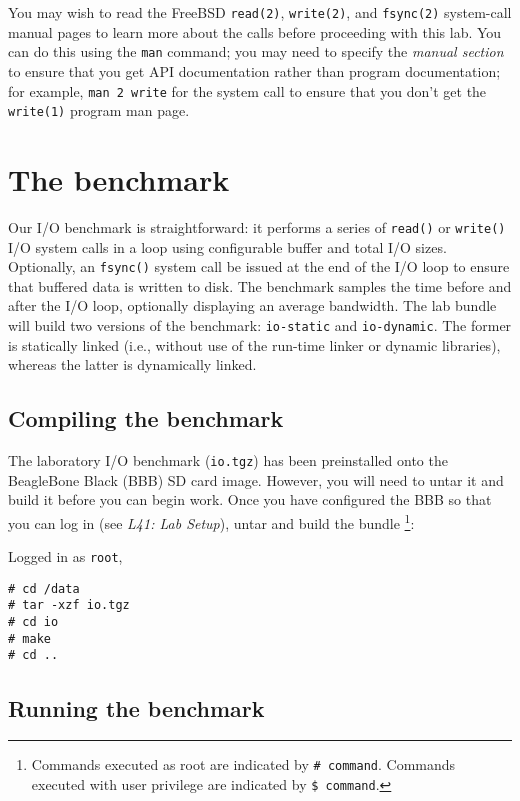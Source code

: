 \documentclass[a4paper,10pt]{article}
\begin{document}
You may wish to read the FreeBSD \texttt{read(2)}, \texttt{write(2)}, and
\texttt{fsync(2)} system-call manual pages to learn more about the calls
before proceeding with this lab.
You can do this using the \texttt{man} command; you may need to specify the
\textit{manual section} to ensure that you get API documentation rather than
program documentation; for example, \texttt{man 2 write} for the system call
to ensure that you don't get the \texttt{write(1)} program man page.

\section*{The benchmark}

Our I/O benchmark is straightforward: it performs a series of \texttt{read()}
or \texttt{write()} I/O system calls in a loop using configurable buffer and
total I/O sizes.
Optionally, an \texttt{fsync()} system call be issued at the end of the I/O
loop to ensure that buffered data is written to disk.
The benchmark samples the time before and after the I/O loop, optionally
displaying an average bandwidth.
The lab bundle will build two versions of the benchmark: \texttt{io-static}
and \texttt{io-dynamic}.
The former is statically linked (i.e., without use of the run-time linker or
dynamic libraries), whereas the latter is dynamically linked.

\subsection*{Compiling the benchmark}

The laboratory I/O benchmark (\texttt{io.tgz}) has been preinstalled onto the
BeagleBone Black (BBB) SD card image. However, you will need to untar it and
build it before you can begin work.  Once you have configured the BBB so that
you can log in (see \textit{L41: Lab Setup}), untar and build the bundle
\footnote{Commands executed as root are indicated by \texttt{\# command}.
Commands executed with user privilege are indicated by \texttt{\$ command}.}:

\noindent
Logged in as \texttt{root}, 
\begin{verbatim}
# cd /data
# tar -xzf io.tgz
# cd io
# make
# cd ..
\end{verbatim}

\subsection*{Running the benchmark}
\end{document}

